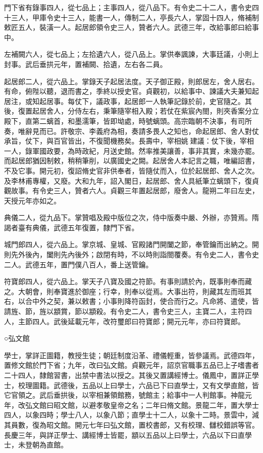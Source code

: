 \begin{pinyinscope}
 門下省有錄事四人，從七品上；主事四人，從八品下。有令史二十二人，書令史四十三人，甲庫令史十三人，能書一人，傳制二人，亭長六人，掌固十四人，脩補制敕匠五人，裝潢一人。起居郎領令史三人，贊者六人。武德三年，改給事郎曰給事中。



 左補闕六人，從七品上；左拾遺六人，從八品上。掌供奉諷諫，大事廷議，小則上封事。武后垂拱元年，置補闕、拾遺，左右各二員。



 起居郎二人，從六品上。掌錄天子起居法度。天子御正殿，則郎居左，舍人居右。有命，俯陛以聽，退而書之，季終以授史官。貞觀初，以給事中、諫議大夫兼知起居注，或知起居事。每仗下，議政事，起居郎一人執筆記錄於前，史官隨之。其後，復置起居舍人，分侍左右，秉筆隨宰相入殿；若仗在紫宸內閤，則夾香案分立殿下，直第二螭首，和墨濡筆，皆即坳處，時號螭頭。高宗臨朝不決事，有司所奏，唯辭見而已。許敬宗、李義府為相，奏請多畏人之知也，命起居郎、舍人對仗承旨，仗下，與百官皆出，不復聞機務矣。長壽中，宰相姚建議：仗下後，宰相一人，錄軍國政要，為時政紀，月送史館。然率推美讓善，事非其實，未幾亦罷。而起居郎猶因制敕，稍稍筆削，以廣國史之闕。起居舍人本記言之職，唯編詔書，不及它事。開元初，復詔脩史官非供奉者，皆隨仗而入，位於起居郎、舍人之次。及李林甫專權，又廢。大和九年，詔入閣日，起居郎、舍人具紙筆立螭頭下，復貞觀故事。有令史三人，贊者六人。貞觀三年置起居郎，廢舍人。龍朔二年曰左史，天授元年亦如之。



 典儀二人，從九品下。掌贊唱及殿中版位之次，侍中版奏中嚴、外辦，亦贊焉。隋謁者臺有典儀，武德五年復置，隸門下省。



 城門郎四人，從六品上。掌京城、皇城、官殿諸門開闔之節，奉管鑰而出納之。開則先外後內，闔則先內後外；啟閉有時，不以時則詣閤覆奏。有令史二人，書令史二人。武德五年，置門僕八百人，番上送管鑰。



 符寶郎四人，從六品上。掌天子八寶及國之符節。有事則請於內，既事則奉而藏之。大朝會，則奉寶進於御座；行幸，則奉以從焉。大事出符，則藏其左而班其右，以合中外之契，兼以敕書；小事則降符函封，使合而行之。凡命將、遣使，皆請旌、節，旌以顓賞，節以顓殺。有令史二人，書令史三人，主寶二人，主符四人，主節四人。武後延載元年，改符璽郎曰符寶郎；開元元年，亦曰符寶郎。



 ○弘文館



 學士，掌詳正圖籍，教授生徒；朝廷制度沿革、禮儀輕重，皆參議焉。武德四年，置修文館於門下省；九年，改曰弘文館。貞觀元年，詔京官職事五品已上子嗜書者二十四人，隸館習書，出禁中書法以授之。其後又置講經博士。儀鳳中，置詳正學士，校理圖籍。武德後，五品以上曰學士，六品已下曰直學士，又有文學直館，皆它官領之。武后垂拱後，以宰相兼領館務，號館主；給事中一人判館事。神龍元年，改弘文館曰昭文館，以避孝敬皇帝之名；二年曰脩文館。景龍二年，置大學士四人，以象四時；學士八人，以象八節；直學士十二人，以象十二時。景雲中，減其員數，復為昭文館。開元七年曰弘文館，置校書郎，又有校理、讎校錯誤等官。長慶三年，與詳正學士、講經博士皆罷，顓以五品以上曰學士，六品以下曰直學士，未登朝為直館。




\end{pinyinscope}
